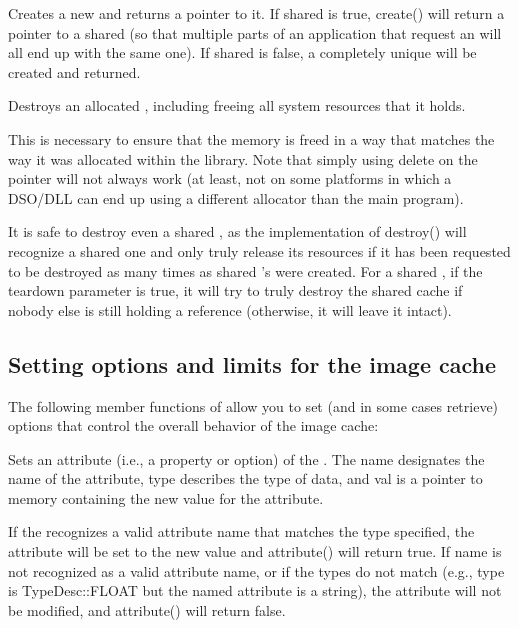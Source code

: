 
Creates a new \ImageCache and returns a pointer to it.  If 
{\cf shared} is {\cf true}, {\cf create()} will return a pointer
to a shared \ImageCache (so that multiple parts of an application
that request an \ImageCache will all end up with the same one).
If {\cf shared} is {\cf false}, a completely unique \ImageCache
will be created and returned.

\apiend

Destroys an allocated \ImageCache, including freeing all system
resources that it holds.

This is necessary to ensure that the memory is freed in a way that
matches the way it was allocated within the library.  Note that simply
using {\cf delete} on the pointer will not always work (at least,
not on some platforms in which a DSO/DLL can end up using a different
allocator than the main program).

It is safe to destroy even a shared \ImageCache, as the implementation
of {\cf destroy()} will recognize a shared one and only truly release
its resources if it has been requested to be destroyed as many times as
shared \ImageCache's were created.  For a shared \ImageCache, if the
{\cf teardown} parameter is {\cf true}, it will try to truly destroy the
shared cache if nobody else is still holding a reference (otherwise,
it will leave it intact).
\apiend

\subsection{Setting options and limits for the image cache}
\label{sec:imagecache:api:attribute}

The following member functions of \ImageCache allow you to set
(and in some cases retrieve) options that control the overall
behavior of the image cache:


Sets an attribute (i.e., a property or option) of the \ImageCache.
The {\cf name} designates the name of the attribute, {\cf type}
describes the type of data, and {\cf val} is a pointer to memory 
containing the new value for the attribute.

If the \ImageCache recognizes a valid attribute name that matches the
type specified, the attribute will be set to the new value and {\cf
  attribute()} will return {\cf true}.  If {\cf name} is not recognized
as a valid attribute name, or if the types do not match (e.g., {\cf
  type} is {\cf TypeDesc::FLOAT} but the named attribute is a string),
the attribute will not be modified, and {\cf attribute()} will return
{\cf false}.

